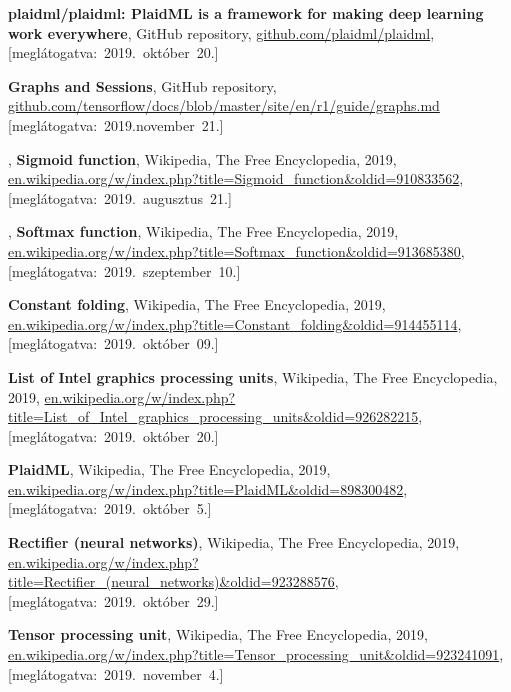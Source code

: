 \begin{thebibliography}{9}

	\textbf{plaidml/plaidml: PlaidML is a framework for making deep learning work everywhere},
	GitHub repository,
	{\footnotesize\url{github.com/plaidml/plaidml}},
	\mbox{[meglátogatva:~2019.~október~20.]}

	\textbf{Graphs and Sessions},
	GitHub repository,
	{\footnotesize\url{github.com/tensorflow/docs/blob/master/site/en/r1/guide/graphs.md}}
	\mbox{[meglátogatva:~2019.november~21.]}

,
	\textbf{Sigmoid function},
	{Wikipedia}{,} The Free Encyclopedia,
	2019,
	{\footnotesize\url{en.wikipedia.org/w/index.php?title=Sigmoid_function&oldid=910833562}},
	\mbox{[meglátogatva:~2019.~augusztus~21.]}

,
\textbf{Softmax function},
{Wikipedia}{,} The Free Encyclopedia,
2019,
{\footnotesize\url{en.wikipedia.org/w/index.php?title=Softmax_function&oldid=913685380}},
\mbox{[meglátogatva:~2019.~szeptember~10.]}


	\textbf{Constant folding},
	{Wikipedia}{,} The Free Encyclopedia,
	2019,
	{\footnotesize\url{en.wikipedia.org/w/index.php?title=Constant_folding&oldid=914455114}},
	\mbox{[meglátogatva:~2019.~október~09.]}

	\textbf{List of Intel graphics processing units},
	{Wikipedia}{,} The Free Encyclopedia,
	2019,
	{\footnotesize\url{en.wikipedia.org/w/index.php?title=List_of_Intel_graphics_processing_units&oldid=926282215}},
	\mbox{[meglátogatva:~2019.~október~20.]}

	\textbf{PlaidML},
	{Wikipedia}{,} The Free Encyclopedia,
	2019,
	{\footnotesize\url{en.wikipedia.org/w/index.php?title=PlaidML&oldid=898300482}},
	\mbox{[meglátogatva:~2019.~október~5.]}

	\textbf{Rectifier (neural networks)},
	{Wikipedia}{,} The Free Encyclopedia,
	2019,
	{\footnotesize\url{ en.wikipedia.org/w/index.php?title=Rectifier_(neural_networks)&oldid=923288576}},
	\mbox{[meglátogatva:~2019.~október~29.]}

	\textbf{Tensor processing unit},
	{Wikipedia}{,} The Free Encyclopedia,
	2019,
	{\footnotesize\url{en.wikipedia.org/w/index.php?title=Tensor_processing_unit&oldid=923241091}},
	\mbox{[meglátogatva:~2019.~november~4.]}


\end{thebibliography}
